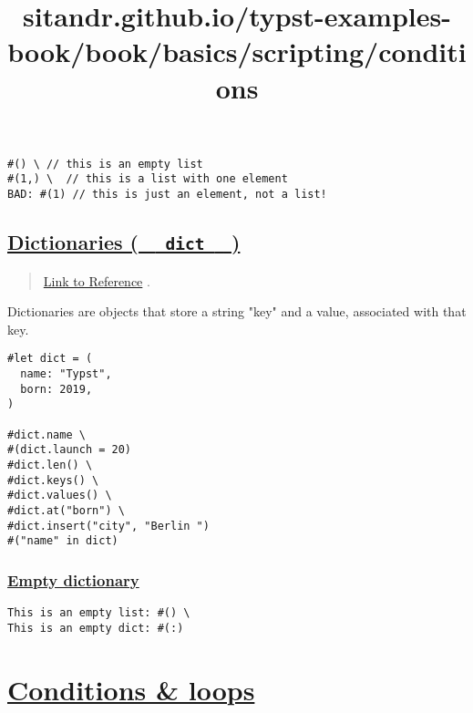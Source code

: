 \begin{verbatim}
#() \ // this is an empty list
#(1,) \  // this is a list with one element
BAD: #(1) // this is just an element, not a list!
\end{verbatim}

\pandocbounded{}

\subsection{\texorpdfstring{\hyperref[dictionaries-dict]{Dictionaries (
\texttt{\ }{\texttt{\ dict\ }}\texttt{\ }
)}}{Dictionaries (   dict   )}}\label{dictionaries-dict}

\begin{quote}
\href{https://typst.app/docs/reference/foundations/dictionary/}{Link to
Reference} .
\end{quote}

Dictionaries are objects that store a string "key" and a value,
associated with that key.

\begin{verbatim}
#let dict = (
  name: "Typst",
  born: 2019,
)

#dict.name \
#(dict.launch = 20)
#dict.len() \
#dict.keys() \
#dict.values() \
#dict.at("born") \
#dict.insert("city", "Berlin ")
#("name" in dict)
\end{verbatim}

\pandocbounded{}

\subsubsection{\texorpdfstring{\hyperref[empty-dictionary]{Empty
dictionary}}{Empty dictionary}}\label{empty-dictionary}

\begin{verbatim}
This is an empty list: #() \
This is an empty dict: #(:)
\end{verbatim}

\pandocbounded{}


\title{sitandr.github.io/typst-examples-book/book/basics/scripting/conditions}

\section{\texorpdfstring{\hyperref[conditions--loops]{Conditions \&
loops}}{Conditions \& loops}}\label{conditions--loops}

